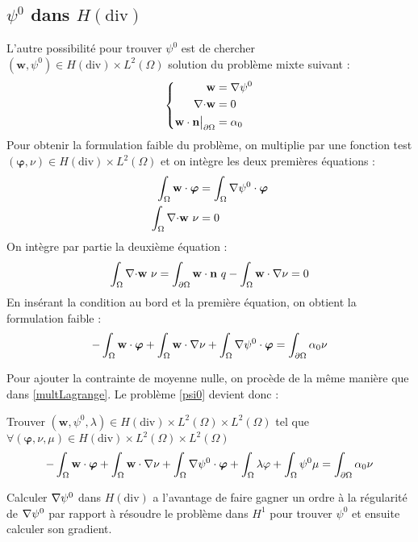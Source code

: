 \subsection{$\psi^0$ dans $H(\mathrm{div})$}

L'autre possibilité pour trouver $\psi^0$ est de chercher $(\mathbf{w},\psi^0)\in H(\mathrm{div})\times L^2(\Omega)$ solution du problème mixte suivant :
\begin{equation*}
\left\{\begin{aligned}
\mathbf{w} &= {\nabla} \psi^0\\
{\nabla\cdot} \mathbf{w} &= 0\\
\mathbf{w}\cdot \mathbf{n}{\big\rvert_{\partial\Omega}} &= \alpha_0
\end{aligned}\right.
\end{equation*}
Pour obtenir la formulation faible du problème, on multiplie par une fonction test $(\bm{\varphi},\nu)\in H(\mathrm{div})\times L^2(\Omega)$ et on intègre les deux premières équations :
\begin{align*}
\int_\Omega \mathbf{w}\cdot\bm{\varphi} &= \int_\Omega {\nabla}\psi^0\cdot\bm{\varphi}\\
\int_\Omega {\nabla\cdot} \mathbf{w}\ \nu &= 0
\end{align*}
On intègre par partie la deuxième équation :
\[ \int_\Omega {\nabla\cdot} \mathbf{w}\ \nu = \int_{\partial\Omega} \mathbf{w}\cdot \mathbf{n}\ q - \int_\Omega \mathbf{w}\cdot{\nabla}\nu = 0  \]
En insérant la condition au bord et la première équation, on obtient la formulation faible :
\[ -\int_\Omega \mathbf{w}\cdot\bm{\varphi} + \int_\Omega \mathbf{w}\cdot{\nabla}\nu + \int_\Omega {\nabla}\psi^0\cdot\bm{\varphi}  = \int_{\partial\Omega} \alpha_0\nu \]

Pour ajouter la contrainte de moyenne nulle, on procède de la même manière que dans \ref{multLagrange}. Le problème \ref{psi0} devient donc :
\begin{pb}\label{fvpsidiv}
Trouver $(\mathbf{w},\psi^0,\lambda)\in H(\mathrm{div})\times L^2(\Omega)\times L^2(\Omega)$ tel que $\forall (\bm{\varphi},\nu,\mu)\in H(\mathrm{div})\times L^2(\Omega)\times L^2(\Omega)$
\begin{equation*}
-\int_\Omega \mathbf{w}\cdot\bm{\varphi} + \int_\Omega \mathbf{w}\cdot{\nabla}\nu + \int_\Omega {\nabla}\psi^0\cdot\bm{\varphi} + \int_\Omega \lambda\varphi + \int_\Omega \psi^0\mu = \int_{\partial\Omega} \alpha_0\nu
\end{equation*}\end{pb}

\begin{rk}
Calculer ${\nabla}\psi^0$ dans $H(\mathrm{div})$ a l'avantage de faire gagner un ordre à la régularité de ${\nabla}\psi^0$ par rapport à résoudre le problème dans $H^1$ pour trouver $\psi^0$ et ensuite calculer son gradient.
\end{rk}

